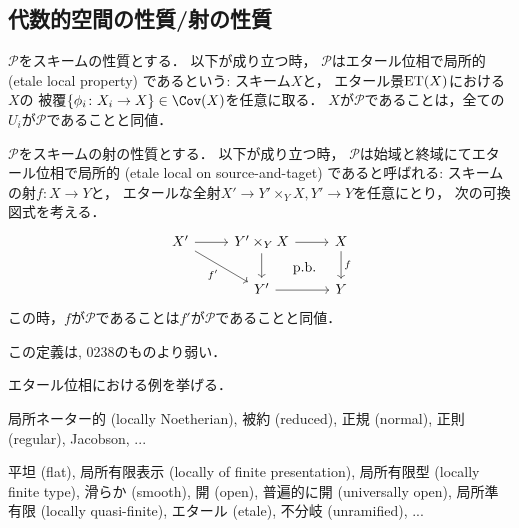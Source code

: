 \subsection{代数的空間の性質/射の性質}
    \begin{Def}
    \begin{myenum}
    \item
        $\mathcal{P}$をスキームの性質とする．
        以下が成り立つ時，
        $\mathcal{P}$はエタール位相で局所的 (etale local property) であるという: \newline
        スキーム$X$と，
        エタール景$\mathrm{ET}(X)$における$X$の
        被覆$\{\phi_i \colon X_i \to X\} \in \Cov(X)$を任意に取る．
        $X$が$\mathcal{P}$であることは，全ての$U_i$が$\mathcal{P}$であることと同値．
    \item
        $\mathcal{P}$をスキームの射の性質とする．
        以下が成り立つ時，
        $\mathcal{P}$は始域と終域にてエタール位相で局所的 (etale local on source-and-taget) であると呼ばれる: \newline
        スキームの射$f \colon X \to Y$と，
        エタールな全射$X' \to Y' \times_{Y} X, Y' \to Y$を任意にとり，
        次の可換図式を考える．
        \[
        \begin{tikzcd}
            X' \ar[r] \ar[rd, "f'"']& Y' \times_{Y} X \ar[r]\ar[d]& X \ar[d, "f"]\\
            {} & Y' \ar[r]& Y \ar[lu, phantom, "\text{p.b.}"]
        \end{tikzcd}
        \]
        この時，$f$が$\mathcal{P}$であることは$f'$が$\mathcal{P}$であることと同値．
    \end{myenum}
    \end{Def}
    この定義は\cite{Olsson16}, \cite{SP} 0238のものより弱い．

    \begin{Example}[\cite{SP} 0238]
    エタール位相における例を挙げる．
    \begin{description}[labelindent=0.5cm]
    \item[エタール位相で局所的な性質の例] \mnewline
        局所ネーター的 (locally Noetherian), 被約 (reduced), 正規 (normal), 正則 (regular), Jacobson, ...

    \item[始域と終域にてエタール位相で局所的な性質の例] \mnewline
        平坦 (flat), 局所有限表示 (locally of finite presentation), 局所有限型 (locally finite type),
        滑らか (smooth), 開 (open), 普遍的に開 (universally open), 局所準有限 (locally quasi-finite), 
        エタール (etale), 不分岐 (unramified), ...
    \end{description}
    \end{Example}

